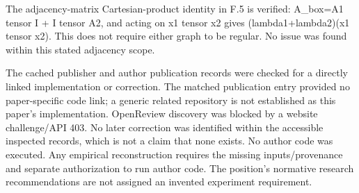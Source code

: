 \documentclass[10pt]{article}
\begin{document}
The adjacency-matrix Cartesian-product identity in F.5 is verified: A\_box=A1 tensor I + I tensor A2, and acting on x1 tensor x2 gives (lambda1+lambda2)(x1 tensor x2). This does not require either graph to be regular. No issue was found within this stated adjacency scope.\par
The cached publisher and author publication records were checked for a directly linked implementation or correction. The matched publication entry provided no paper-specific code link; a generic related repository is not established as this paper’s implementation. OpenReview discovery was blocked by a website challenge/API 403. No later correction was identified within the accessible inspected records, which is not a claim that none exists. No author code was executed. Any empirical reconstruction requires the missing inputs/provenance and separate authorization to run author code. The position’s normative research recommendations are not assigned an invented experiment requirement.\par
\end{document}
